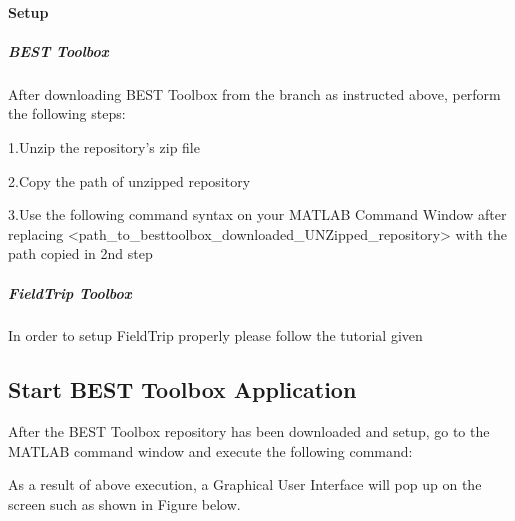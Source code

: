 \documentclass[letterpaper,10pt,english]{sphinxmanual}
\begin{document}
\paragraph{Setup}
\label{\detokenize{2_DownloadAndSetup:setup}}

\subparagraph{BEST Toolbox}
\label{\detokenize{2_DownloadAndSetup:best-toolbox}}
\sphinxAtStartPar
After downloading BEST Toolbox from the branch as instructed above, perform the following steps:

\sphinxAtStartPar
1.Unzip the repository’s zip file

\sphinxAtStartPar
2.Copy the path of unzipped repository

\sphinxAtStartPar
3.Use the following command syntax on your MATLAB Command Window after replacing \textless{}path\_to\_besttoolbox\_downloaded\_UNZipped\_repository\textgreater{} with the path copied in 2nd step

\begin{sphinxVerbatim}[commandchars=\\\{\}]
\end{sphinxVerbatim}


\subparagraph{FieldTrip Toolbox}
\label{\detokenize{2_DownloadAndSetup:fieldtrip-toolbox}}
\sphinxAtStartPar
In order to setup FieldTrip properly please follow the tutorial given 


\subsection{Start BEST Toolbox Application}
\label{\detokenize{3_StartBESTToolboxApplication:start-best-toolbox-application}}\label{\detokenize{3_StartBESTToolboxApplication::doc}}
\sphinxAtStartPar
After the BEST Toolbox repository has been downloaded and setup, go to the MATLAB command window and execute the following command:

\begin{sphinxVerbatim}[commandchars=\\\{\}]
\end{sphinxVerbatim}

\sphinxAtStartPar
As a result of above execution, a Graphical User Interface will pop up on the screen such as shown in Figure below.
\end{document}

